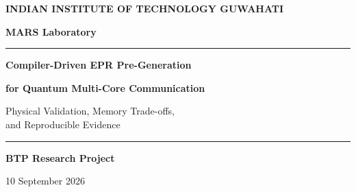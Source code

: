 \documentclass[11pt,a4paper]{report}
\begin{document}
\begin{titlepage}
\thispagestyle{empty}
\centering
\vspace*{1.1cm}
{\Large\bfseries INDIAN INSTITUTE OF TECHNOLOGY GUWAHATI\par}
\vspace{0.18cm}
{\large\bfseries MARS Laboratory\par}
\vspace{0.38cm}
\rule{0.78\textwidth}{1.2pt}\par
\vspace{1.15cm}
{\fontsize{28}{34}\selectfont\bfseries
Compiler-Driven EPR Pre-Generation\par}
\vspace{0.20cm}
{\fontsize{22}{28}\selectfont\bfseries
for Quantum Multi-Core Communication\par}
\vspace{0.80cm}
{\Large Physical Validation, Memory Trade-offs,\\
and Reproducible Evidence\par}
\vfill
\begin{minipage}{0.78\textwidth}
\centering
\rule{0.78\textwidth}{0.6pt}\par
\vspace{0.35cm}
{\large\bfseries BTP Research Project\par}
\vspace{0.14cm}
{\large 10 September 2026\par}
\end{minipage}
\vspace*{0.8cm}
\end{titlepage}
\begin{abstract}
This report studies whether a compiler that knows a future inter-core
communication trace can reduce quantum-communication service latency by
preparing request-specific EPR pairs before they are needed. The work starts
with topology-correct multi-core communication and analytical scheduling, then
executes the same compiler intent through two physical backends: ACE and native
SeQUeNCe. Every final numerical claim is tied to a hash-locked workload,
immutable contract, paired seeds, raw provenance, completion check, and
pair-identity audit.

This is a living technical report. Tables labelled ``audited'' may be cited;
tables labelled ``historical'' retain context but are not combined with newer
corrected studies. The native six-lead matrices remain pending; completed ACE
matrices are reported with their audits and provenance.
\end{abstract}
\tableofcontents
\clearpage
\end{document}
